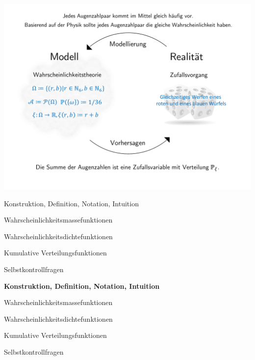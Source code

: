 \documentclass[
  8pt,
  ignorenonframetext,
]{beamer}
\begin{document}
\begin{frame}{}
\protect\hypertarget{section-3}{}
\begin{center}\includegraphics[width=0.9\linewidth]{4_Abbildungen/wtfi_4_wahrscheinlichkeitstheorie_modell_beispiel} \end{center}
\end{frame}

\begin{frame}{}
\protect\hypertarget{section-4}{}
\large
{}
\vfill

Konstruktion, Definition, Notation, Intuition

Wahrscheinlichkeitsmassefunktionen

Wahrscheinlichkeitsdichtefunktionen

Kumulative Verteilungsfunktionen

Selbstkontrollfragen \vfill
\end{frame}

\begin{frame}{}
\protect\hypertarget{section-5}{}
\large
{}
\vfill

\textbf{Konstruktion, Definition, Notation, Intuition}

Wahrscheinlichkeitsmassefunktionen

Wahrscheinlichkeitsdichtefunktionen

Kumulative Verteilungsfunktionen

Selbstkontrollfragen \vfill
\end{frame}
\end{document}
